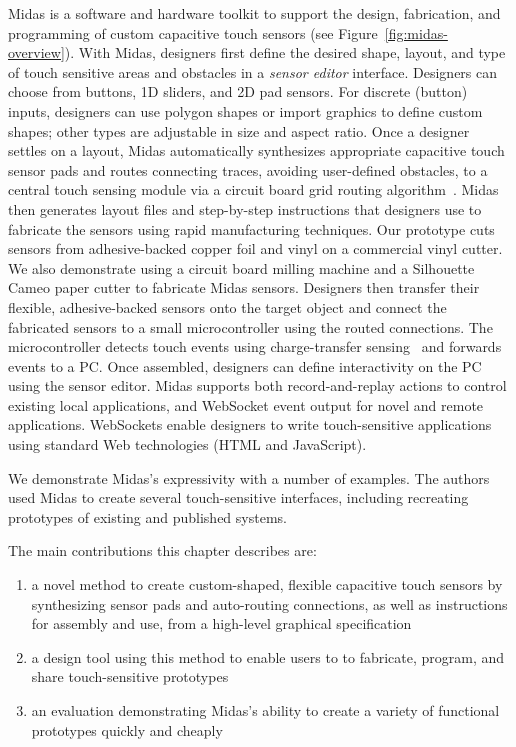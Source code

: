 Midas is a software and hardware toolkit to support the design, fabrication, and programming of custom capacitive touch sensors (see Figure~\ref{fig:midas-overview}). With Midas, designers first define the desired shape, layout, and type of touch sensitive areas and obstacles in a {\em sensor editor} interface. Designers can choose from buttons, 1D sliders, and 2D pad sensors. For discrete (button) inputs, designers can use polygon shapes or import graphics to define custom shapes; other types are adjustable in size and aspect ratio. Once a designer settles on a layout, Midas automatically synthesizes appropriate capacitive touch sensor pads and routes connecting traces, avoiding user-defined obstacles, to a central touch sensing module via a circuit board grid routing algorithm~\cite{lee-maze}. Midas then generates layout files and step-by-step instructions that designers use to fabricate the sensors using rapid manufacturing techniques. Our prototype cuts sensors from adhesive-backed copper foil and vinyl on a commercial vinyl cutter. We also demonstrate using a circuit board milling machine and a Silhouette Cameo paper cutter to fabricate Midas sensors. Designers then transfer their flexible, adhesive-backed sensors onto the target object and connect the fabricated sensors to a small microcontroller using the routed connections. The microcontroller detects touch events using charge-transfer sensing~\cite{philipp-chargetransfer} and forwards events to a PC. Once assembled, designers can define interactivity on the PC using the sensor editor. Midas supports both record-and-replay actions to control existing local applications, and WebSocket event output for novel and remote applications. WebSockets enable designers to write touch-sensitive applications using standard Web technologies (HTML and JavaScript).

We demonstrate Midas's expressivity with a number of examples. The authors used Midas to create several touch-sensitive interfaces, including recreating prototypes of existing and published systems.

The main contributions this chapter describes are: \begin{enumerate}
\item a novel method to create custom-shaped, flexible capacitive touch sensors by synthesizing sensor pads and auto-routing connections, as well as instructions for assembly and use, from a high-level graphical specification
\item a design tool using this method to enable users to to fabricate, program, and share touch-sensitive prototypes
\item an evaluation demonstrating Midas's ability to create a variety of functional prototypes quickly and cheaply
\end{enumerate}

